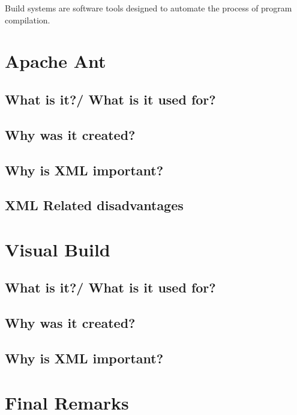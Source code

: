 Build systems are software tools designed to automate the process of program compilation. 

\section{Apache Ant}
\subsection{What is it?/ What is it used for?}
\subsection{Why was it created?}
\subsection{Why is XML important?}
\subsection{XML Related disadvantages}

\section{Visual Build}
\subsection{What is it?/ What is it used for?}
\subsection{Why was it created?}
\subsection{Why is XML important?}

\section{Final Remarks}

